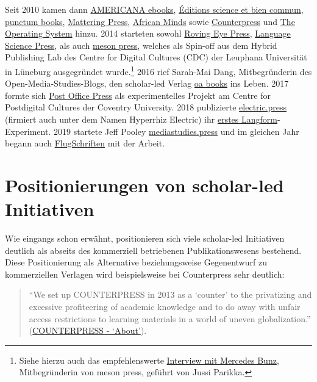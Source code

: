 \documentclass[a4paper,
fontsize=11pt,
oneside,
numbers=noperiodatend,
parskip=half-,
bibliography=totoc,
final
]{scrartcl}
\begin{document}
Seit 2010 kamen dann
\href{https://ebooks.americanaejournal.hu/about/}{AMERICANA ebooks},
\href{https://www.editionscienceetbiencommun.org/en/}{Éditions science
et bien commun},
\href{https://punctumbooks.com/about/vision-statement/}{punctum books},
\href{https://www.matteringpress.org/about}{Mattering Press},
\href{https://www.africanminds.co.za/}{African Minds} sowie
\href{https://counterpress.org.uk/about/}{Counterpress} und
\href{https://www.theoperatingsystem.org/}{The Operating System} hinzu.
2014 starteten sowohl
\href{https://web.archive.org/web/20160113000302/http://www.rovingeyepress.com/}{Roving
Eye Press}, \href{https://langsci-press.org/about}{Language Science
Press}, als auch \href{https://meson.press/about/}{meson press}, welches
als Spin-off aus dem Hybrid Publishing Lab des Centre for Digital
Cultures (CDC) der Leuphana Universität in Lüneburg ausgegründet
wurde.\footnote{Siehe hierzu auch das empfehlenswerte
  \href{https://jussiparikka.net/2014/07/11/a-mini-interview-mercedes-bunz-explains-meson-press/}{Interview
  mit Mercedes Bunz}, Mitbegründerin von meson press, geführt von Jussi
  Parikka.} 2016 rief Sarah-Mai Dang, Mitbegründerin des
Open-Media-Studies-Blogs, den scholar-led Verlag
\href{https://www.oabooks.de/verlag/}{oa books} ins Leben. 2017 formte
sich \href{https://hcommons.org/members/pop/}{Post Office Press} als
experimentelles Projekt am Centre for Postdigital Cultures der Coventry
University. 2018 publizierte
\href{http://electric.press/about.html}{electric.press} (firmiert auch
unter dem Namen Hyperrhiz Electric) ihr
\href{http://electric.press/books/middleshore.html}{erstes
Langform}-Experiment. 2019 startete Jeff Pooley
\href{https://www.mediastudies.press/}{mediastudies.press} und im
gleichen Jahr begann auch
\href{https://flugschriften.com}{FlugSchriften} mit der Arbeit.

\hypertarget{positionierungen-von-scholar-led-initiativen}{%
\section{Positionierungen von scholar-led
Initiativen}\label{positionierungen-von-scholar-led-initiativen}}

Wie eingangs schon erwähnt, positionieren sich viele scholar-led
Initiativen deutlich als abseits des kommerziell betriebenen
Publikationswesens bestehend. Diese Positionierung als Alternative
beziehungsweise Gegenentwurf zu kommerziellen Verlagen wird
beispielsweise bei Counterpress sehr deutlich:

\begin{quote}
\enquote{We set up COUNTERPRESS in 2013 as a \enquote*{counter} to the
privatizing and excessive profiteering of academic knowledge and to do
away with unfair access restrictions to learning materials in a world of
uneven globalization.}
(\href{https://counterpress.org.uk/about/}{COUNTERPRESS -
\enquote*{About}}).
\end{quote}
\end{document}
